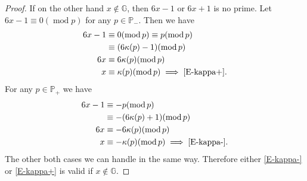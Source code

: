 \documentclass[10pt,a4paper]{amsart}
\newcommand{\G}{\mathbb{G}}
\newcommand{\mood}[1]{(\operatorname{mod} #1)}
\newcommand{\p}{\mathbb{P}}
\begin{document}
\begin{proof}
If on the other hand $x \notin \G$, then $6x-1$ or $6x+1$ is no prime. 
Let $6x-1 \equiv 0 \mood{p}$ for any $p \in \p_-$. Then we have
\begin{align*}
6x-1 &\equiv 0 \mood{p}\equiv p \mood{p}\\
&\equiv (6\kappa(p)-1) \mood{p}\\
6x &\equiv 6\kappa(p) \mood{p}\\
x &\equiv \kappa(p) \mood{p}\implies \eqref{E-kappa+}.
\end{align*}
For any $p \in \p_+$ we have
\begin{align*}
6x-1 &\equiv -p \mood{p}\\
&\equiv -(6\kappa(p)+1) \mood{p}\\
6x &\equiv -6\kappa(p) \mood{p}\\
x &\equiv -\kappa(p) \mood{p}\implies \eqref{E-kappa-}.
\end{align*}
The other both cases we can handle in the same way. Therefore either \eqref{E-kappa-} or \eqref{E-kappa+} is valid if $x \notin \G$.
\end{proof}
\end{document}
